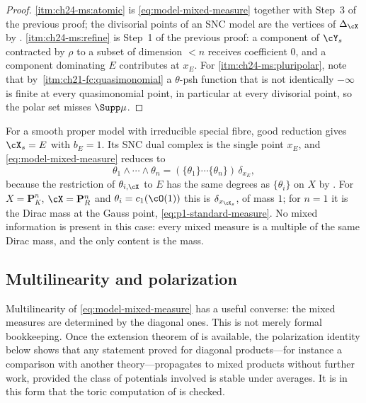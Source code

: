 \begin{proof}
\cref{itm:ch24-ms:atomic} is \eqref{eq:model-mixed-measure} together with
Step~3 of the previous proof; the divisorial points of an SNC model are the
vertices of $\Delta_{\cX}$ by .
\cref{itm:ch24-ms:refine} is Step~1 of the previous proof: a component of
$\cY_s$ contracted by $\rho$ to a subset of dimension $<n$ receives
coefficient $0$, and a component dominating $E$ contributes at
$x_E$.  For \cref{itm:ch24-ms:pluripolar}, note that by
\,\cref{itm:ch21-fc:quasimonomial} a
$\theta$-psh function that is not identically $-\infty$ is finite at every
quasimonomial point, in particular at every divisorial point, so the polar
set misses $\Supp\mu$.
\end{proof}

\begin{example}
\label{ex:ch24-good-reduction}
For a smooth proper model with irreducible special fibre, good reduction
gives $\cX_s=E$ with $b_E=1$.  Its SNC dual complex is the single
point $x_E$,
and \eqref{eq:model-mixed-measure} reduces to
\[
 \theta_1\wedge\cdots\wedge\theta_n=(\{\theta_1\}\cdots\{\theta_n\})\,
 \delta_{x_E},
\]
because the restriction of $\theta_{i,\cX}$ to $E$ has the same degrees
as $\{\theta_i\}$ on $X$ by
.  For $X=\mathbf P^n_K$,
$\cX=\mathbf P^n_R$ and $\theta_i=c_1(\cO(1))$ this is
$\delta_{x_{\cX_s}}$, of mass $1$; for $n=1$ it is the Dirac mass at
the Gauss point, \eqref{eq:p1-standard-measure}.  No mixed information is
present in this case: every mixed measure is a multiple of the same Dirac
mass, and the only content is the mass.
\end{example}

\subsection{Multilinearity and polarization}
\label{sec:ch24-polarization}

Multilinearity of \eqref{eq:model-mixed-measure} has a useful converse: the
mixed measures are determined by the diagonal ones.  This is not merely
formal bookkeeping.  Once the extension theorem of
 is available, the polarization identity below shows
that any statement proved for diagonal products---for instance a comparison
with another theory---propagates to mixed products without further work,
provided the class of potentials involved is stable under averages.  It is
in this form that the toric computation of
 is checked.

